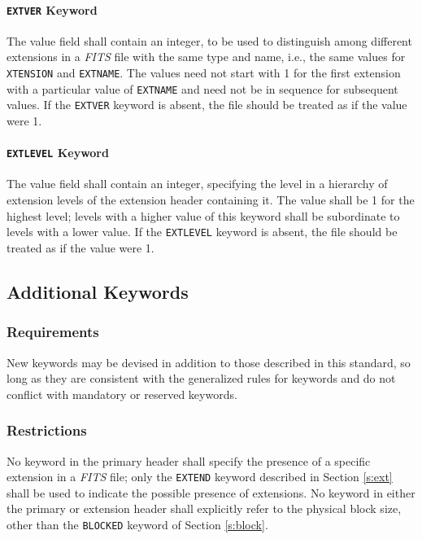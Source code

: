    \paragraph{{\tt EXTVER} Keyword}
 The value field shall contain an integer, to be used to
 distinguish among different extensions in a {\em FITS\/} file
 with the same type and name, i.e., the same values for 
 {\tt XTENSION} and {\tt EXTNAME}. The
 values need not start with 1 for the first extension with
 a particular value of {\tt EXTNAME} and need not be in
 sequence for subsequent values. If the {\tt EXTVER} keyword
 is absent, the file should be treated as if the value
 were 1.
  
   \paragraph{{\tt EXTLEVEL} Keyword}
 The value field shall contain an integer, specifying the
 level in a hierarchy of extension levels of the extension
 header containing it.  The value shall be 1 for the highest
 level; levels with a higher value of this keyword shall be
 subordinate to levels with a lower value. If the {\tt EXTLEVEL}
 keyword is absent, the file should be treated as if the
 value were 1.
  
   \subsection{Additional Keywords}
  
   \subsubsection{Requirements}              
 New keywords
   may be devised in addition to those
   described in this standard, so long as they are consistent
   with the generalized rules for keywords and do not conflict
   with mandatory or reserved keywords.
  
   \subsubsection{Restrictions}
   No keyword in the primary header shall specify
the
   presence of a specific extension in 
   a {\em FITS\/} file; only the {\tt EXTEND} keyword
   described in Section \ref{s:ext} shall be used
   to indicate the possible presence of extensions. No keyword
   in either the primary or extension header shall explicitly
   refer to the physical block size, other than the {\tt BLOCKED}
   keyword of Section \ref{s:block}.
  
